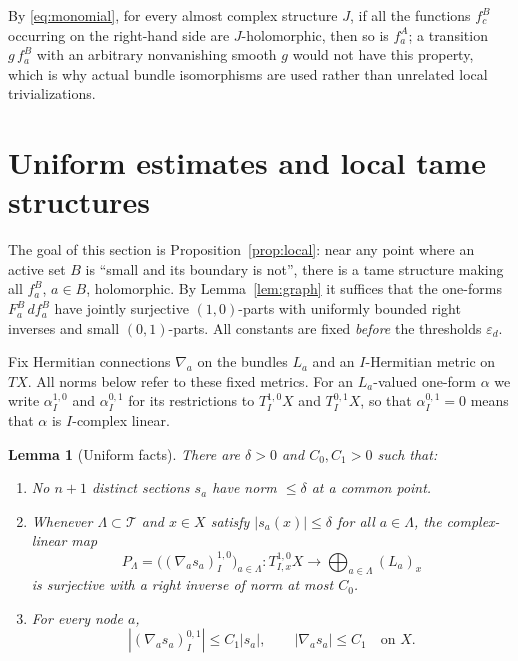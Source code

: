 \documentclass[11pt]{article}
\newtheorem{lemma}[theorem]{Lemma}
\theoremstyle{remark}
\newcommand{\eps}{\varepsilon}
\newcommand{\cT}{\mathcal T}
\begin{document}
By \eqref{eq:monomial}, for every almost complex structure $J$, if all
the functions $f^B_c$ occurring on the right-hand side are
$J$-holomorphic, then so is $f^A_a$; a transition $g\,f^B_a$ with an
arbitrary nonvanishing smooth $g$ would not have this property, which
is why actual bundle isomorphisms are used rather than unrelated local
trivializations.

\section{Uniform estimates and local tame structures}\label{sec:estimates}

The goal of this section is Proposition~\ref{prop:local}: near any
point where an active set $B$ is ``small and its boundary is not'',
there is a tame structure making all $f^B_a$, $a\in B$, holomorphic.
By Lemma~\ref{lem:graph} it suffices that the one-forms $F^B_a\,df^B_a$
have jointly surjective $(1,0)$-parts with uniformly bounded right
inverses and small $(0,1)$-parts. All constants are fixed \emph{before}
the thresholds $\eps_d$.

Fix Hermitian connections $\nabla_a$ on the bundles $L_a$ and an
$I$-Hermitian metric on $TX$. All norms below refer to these fixed
metrics. For an $L_a$-valued one-form $\alpha$ we write
$\alpha^{1,0}_I$ and $\alpha^{0,1}_I$ for its restrictions to
$T^{1,0}_IX$ and $T^{0,1}_IX$, so that $\alpha^{0,1}_I=0$ means that
$\alpha$ is $I$-complex linear.

\begin{lemma}[Uniform facts]\label{lem:uniform}
There are $\delta>0$ and $C_0,C_1>0$ such that:
\begin{enumerate}
\item No $n+1$ distinct sections $s_a$ have norm $\le\delta$ at a
common point.
\item Whenever $\Lambda\subset\cT$ and $x\in X$ satisfy $|s_a(x)|\le\delta$
for all $a\in\Lambda$, the complex-linear map
\begin{equation}\label{eq:PK}
 P_\Lambda=\bigl((\nabla_as_a)^{1,0}_I\bigr)_{a\in\Lambda}
 \colon T^{1,0}_{I,x}X\longrightarrow\bigoplus_{a\in\Lambda}(L_a)_x
\end{equation}
is surjective with a right inverse of norm at most $C_0$.
\item For every node $a$,
\begin{equation}\label{eq:anti}
 |(\nabla_as_a)^{0,1}_I|\le C_1|s_a|,\qquad|\nabla_as_a|\le C_1
 \quad\text{on }X.
\end{equation}
\end{enumerate}
\end{lemma}
\end{document}
